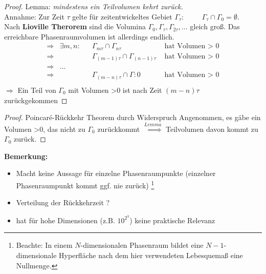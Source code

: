 \begin{proof}{Lemma: \textit{ mindestens ein Teilvolumen kehrt zurück.}}\label{Lemma_poincare}\\
    Annahme: Zur Zeit $\tau$ gelte für zeitentwickeltes Gebiet $\Gamma_{\tau}: \hspace{1cm}\Gamma_{\tau} \cap \Gamma_0 = \emptyset $.\\
    Nach \textbf{Lioville Therorem} sind die Volumina $\Gamma_0, \Gamma_{\tau}, \Gamma_{2\tau}, ...$ gleich groß. Das erreichbare Phasenraumvolumen ist allerdings endlich.
\begin{align*}
    \Rightarrow & \exists m,n : & &\Gamma_{m \tau} \cap \Gamma_{n\tau} &\text{ hat Volumen > 0} \\
     \Rightarrow &  & &\Gamma_{(m-1 )\tau} \cap \Gamma_{(n-1)\tau} &\text{ hat Volumen > 0} \\
     \Rightarrow& ... &&&\\
      \Rightarrow &  & &\Gamma_{(m-n) \tau} \cap \Gamma:{0} &\text{ hat Volumen > 0} \\
\end{align*}
$\Rightarrow$ Ein Teil von $\Gamma_0$ mit Volumen >0 ist nach Zeit $(m-n) \tau$ zurückgekommen
\end{proof}
\begin{proof}{Poincaré-Rückkehr Theorem durch Widerspruch}
    Angenommen, es gäbe ein Volumen >0, das nicht zu $\Gamma_0$ zurückkommt $\stackrel{\textit{Lemma}}{\Rightarrow}$ Teilvolumen davon kommt zu $\Gamma_0$ zurück. \Lightning
\end{proof}

\textbf{Bemerkung:}
\begin{itemize}
    \item Macht keine Aussage für einzelne Phasenraumpunkte (einzelner Phasenraumpunkt kommt ggf. nie zurück) \footnote{Beachte: In einem $N$-dimensionalen Phasenraum bildet eine $N-1$-dimensionale Hyperfläche nach dem hier verwendeten Lebesquemaß eine Nullmenge.}
    \item Verteilung der Rückkehrzeit ?
    \item hat für hohe Dimensionen (z.B. $10^2^3$) keine praktische Relevanz
\end{itemize}

